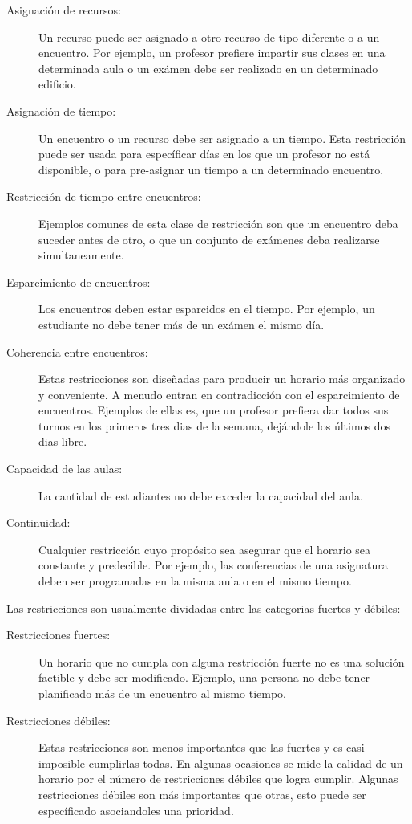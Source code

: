 \begin{description}
	\item[Asignación de recursos:] Un recurso puede ser asignado a otro recurso de tipo diferente o a un encuentro.
		Por ejemplo, un profesor prefiere impartir sus clases en una determinada aula o un exámen debe ser realizado
		en un determinado edificio.
	\item[Asignación de tiempo:] Un encuentro o un recurso debe ser asignado a un tiempo. Esta restricción puede
		ser usada para específicar días en los que un profesor no está disponible, o para pre-asignar un
		tiempo a un determinado encuentro.
	\item[Restricción de tiempo entre encuentros:] Ejemplos comunes de esta clase de restricción son que un encuentro
		deba suceder antes de otro, o que un conjunto de exámenes deba realizarse simultaneamente.
	\item[Esparcimiento de encuentros:] Los encuentros deben estar esparcidos en el tiempo. Por ejemplo, un
		estudiante no debe tener más de un exámen el mismo día.
	\item[Coherencia entre encuentros:] Estas restricciones son diseñadas para producir un horario más organizado
		y conveniente. A menudo entran en contradicción con el esparcimiento de encuentros. Ejemplos de ellas es,
		que un profesor prefiera dar todos sus turnos en los primeros tres dias de la semana, dejándole los
		últimos dos dias libre.
	\item[Capacidad de las aulas:] La cantidad de estudiantes no debe exceder la capacidad del aula.
	\item[Continuidad:] Cualquier restricción cuyo propósito sea asegurar que el horario sea constante y predecible.
		Por ejemplo, las conferencias de una asignatura deben ser programadas en la misma aula o en el mismo tiempo.
\end{description}

Las restricciones son usualmente dividadas entre las categorias fuertes y débiles:

\begin{description}
	\item[Restricciones fuertes:] Un horario que no cumpla con alguna restricción fuerte no es una solución factible
		y debe ser modificado. Ejemplo, una persona no debe tener planificado más de un encuentro al mismo tiempo.
	\item[Restricciones débiles:] Estas restricciones son menos importantes que las fuertes y es casi imposible
		cumplirlas todas. En algunas ocasiones se mide la calidad de un horario por el número de restricciones
		débiles que logra cumplir. Algunas restricciones débiles son más importantes que otras, esto puede ser
		específicado asociandoles una prioridad.
\end{description}

